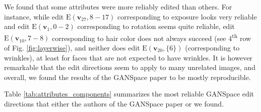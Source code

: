 \documentclass[a4paper]{article}
\begin{document}
We found that some attributes were more reliably edited than others. For instance, while edit $\mathrm{E}(\mathbf{v}_{27}, 8-17)$ corresponding to exposure looks very reliable and edit $\mathrm{E}(\mathbf{v}_1, 0-2)$ corresponding to rotation seems quite reliable, edit $\mathrm{E}(\mathbf{v}_{10}, 7-8)$ corresponding to hair color does not always succeed (see 4\textsuperscript{th} row of Fig. \ref{fig:layerwise}), and neither does edit $\mathrm{E}(\mathbf{v}_{20}, \{6\})$ (corresponding to wrinkles), at least for faces that are not expected to have wrinkles. It is however remarkable that the edit directions seem to apply to many unrelated images, and overall, we found the results of the GANSpace paper to be mostly reproducible.

Table \ref{tab:attributes_components} summarizes the most reliable GANSpace edit directions that either the authors of the GANSpace paper or we found.
\end{document}
